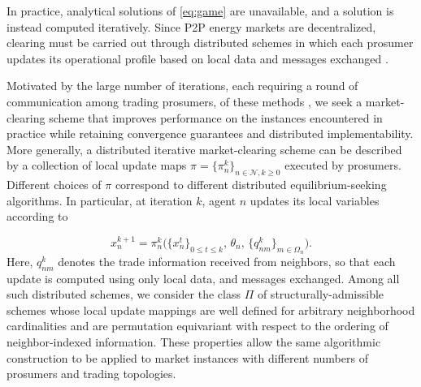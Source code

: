\documentclass[final]{l4dc2026}
\begin{document}
In practice, analytical solutions of \eqref{eq:game} are unavailable, and a solution is instead computed iteratively. Since P2P energy markets are decentralized, clearing must be carried out through distributed schemes in which each prosumer updates its operational profile based on local data and messages exchanged \citep{baroche2019prosumer, belgioioso2022operationally, cadre_peer-peer_2020}.

Motivated by the large number of iterations, each requiring a round of communication among trading prosumers, of these methods \citep{pinson2023may, baroche2019prosumer}, we seek a market-clearing scheme that improves performance on the instances encountered in practice while retaining convergence guarantees and distributed implementability.
More generally, a distributed iterative market-clearing scheme can be described by a collection of local update maps $\pi=\{\pi_n^k\}_{n\in\mathcal{N}, k\geq0}$ executed by prosumers. Different choices of $\pi$ correspond to different distributed equilibrium-seeking algorithms. In particular, at iteration $k$, agent $n$ updates its local variables according to

%
\begin{equation}\label{eq:recursionN}
  x_n^{k+1} = \pi^k_n\Big(\{x_n^t\}_{0\leq t\leq k},\, \theta_n,\,
  \{q_{nm}^k\}_{m\in\Omega_n}\Big).
\end{equation}
%
Here, $q_{nm}^k$ denotes the trade information received from neighbors, so that each update is computed using only local data, and messages exchanged. Among all such distributed schemes, we consider the class $\Pi$ of structurally-admissible schemes whose local update mappings are well defined for arbitrary neighborhood cardinalities and are permutation equivariant with respect to the ordering of neighbor-indexed information. These properties allow the same algorithmic construction to be applied to market instances with different numbers of prosumers and trading topologies.
\end{document}
